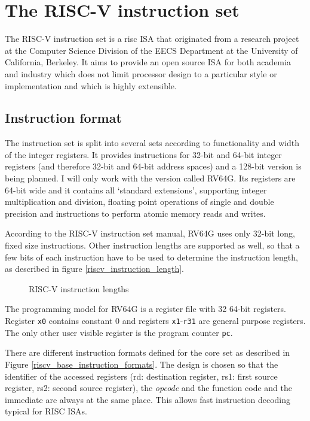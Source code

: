 \documentclass[12pt,twoside,notitlepage]{report}
\begin{document}
\section{The RISC-V instruction set}

The RISC-V instruction set is a \gls{risc} \gls{ISA} that originated from a research project at the Computer Science Division of the EECS Department at the University of California, Berkeley.
It aims to provide an open source \gls{ISA} for both academia and industry which does not limit processor design to a particular style or implementation and which is highly extensible.

\subsection{Instruction format}

The instruction set is split into several sets according to functionality and width of the integer registers.  It provides instructions for 32-bit and 64-bit integer registers (and therefore 32-bit and 64-bit address spaces) and a 128-bit version is being planned. I will only work with the version called RV64G. Its registers are 64-bit wide and it contains all `standard extensions', supporting integer multiplication and division, floating point operations of single and double precision and instructions to perform atomic memory reads and writes.

According to the RISC-V instruction set manual\cite{RISCV_MAN}, RV64G uses only 32-bit long, fixed size instructions. Other instruction lengths are supported as well, so that a few bits of each instruction have to be used to determine the instruction length, as described in figure \ref{riscv_instruction_length}.

\begin{figure}[h]
\centering
\caption{RISC-V instruction lengths}
\end{figure}

The programming model for RV64G is a register file with 32 64-bit registers. Register \texttt{x0} contains constant 0 and registers \texttt{x1}-\texttt{r31} are general purpose registers. The only other user visible register is the program counter \texttt{pc}.

There are different instruction formats defined for the core set as described in Figure \ref{riscv_base_instruction_formats}. The design is chosen so that the identifier of the accessed registers (rd: destination register, rs1: first source register, rs2: second source register), the \textit{opcode} and the function code and the immediate are always at the same place. This allows fast instruction decoding typical for RISC \gls{ISA}s.
\end{document}
